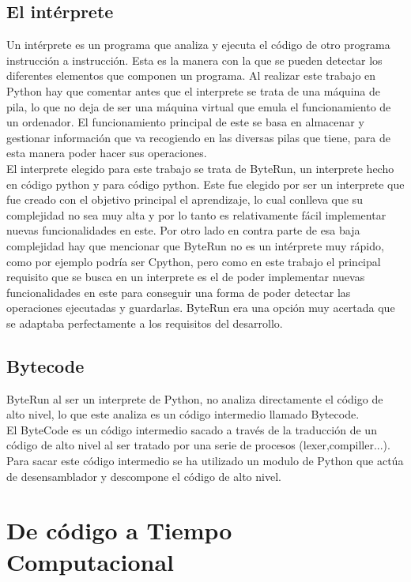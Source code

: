 \subsection{El intérprete}

Un intérprete es un programa que analiza y ejecuta el código de otro programa instrucción a instrucción. Esta es la manera con la que se pueden detectar los diferentes elementos que componen un programa. Al realizar este trabajo en Python hay que comentar antes que el interprete se trata de una máquina de pila\cite{MaquinaP}, lo que no deja de ser una máquina virtual que emula el funcionamiento de un ordenador. El funcionamiento principal de este se basa en almacenar y gestionar información que va recogiendo en las diversas pilas que tiene, para de esta manera poder hacer sus operaciones.\\

El interprete elegido para este trabajo se trata de ByteRun\cite{ByteRun}, un interprete hecho en código python y para código python. Este fue elegido por ser un interprete que fue creado con el objetivo principal el aprendizaje, lo cual conlleva que su complejidad no sea muy alta y por lo tanto es relativamente fácil implementar nuevas funcionalidades en este. Por otro lado en contra parte de esa baja complejidad hay que mencionar que ByteRun no es un intérprete muy rápido, como por ejemplo podría ser Cpython, pero como en este trabajo el principal requisito que se busca en un interprete es el de poder implementar nuevas funcionalidades en este para conseguir una forma de poder detectar las operaciones ejecutadas y guardarlas. ByteRun era una opción muy acertada que se adaptaba perfectamente a los requisitos del desarrollo.


\subsection{Bytecode}
ByteRun al ser un interprete de Python, no analiza directamente el código de alto nivel, lo que este analiza es un código intermedio llamado Bytecode.\\ El ByteCode es un código intermedio sacado a través de la traducción de un código de alto nivel al ser tratado por una serie de procesos (lexer,compiller...). Para sacar este código intermedio se ha utilizado un modulo de Python que actúa de desensamblador y descompone el código de alto nivel. 




\section{De código a Tiempo Computacional}

